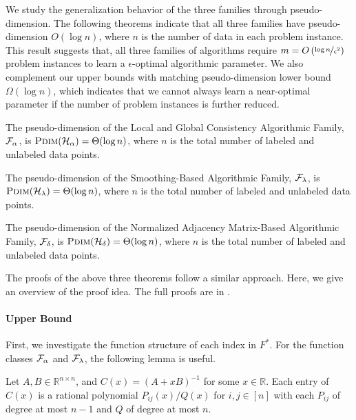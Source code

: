 We study the generalization behavior of the three families through pseudo-dimension. The following theorems indicate that all three families have pseudo-dimension $O(\log n)$, where $n$ is the number of data in each problem instance. This result suggests that, all three families of algorithms require $m = O\left(\nicefrac{\log n}{\epsilon^2}\right)$ problem instances to learn a $\epsilon$-optimal algorithmic parameter. We also complement our upper bounds with matching pseudo-dimension lower bound $\Omega(\log n)$, which indicates that we cannot always learn a near-optimal parameter if the number of problem instances is further reduced.

\begin{theorem} \label{thm:alpha upper bound}
    The pseudo-dimension of the Local and Global Consistency Algorithmic Family, $\mathcal{F}_\alpha$, is $\textsc{Pdim}(\mathcal{H}_\alpha) = \Theta(\log n)$, where $n$ is the total number of labeled and unlabeled data points.
\end{theorem}

\begin{theorem}\label{thm:lambda upper bound}
    The pseudo-dimension of the Smoothing-Based Algorithmic Family, $\mathcal{F}_\lambda$, is $\textsc{Pdim}(\mathcal{H}_\lambda) = \Theta(\log n)$, where $n$ is the total number of labeled and unlabeled data points.
\end{theorem}

\begin{theorem}\label{thm:delta upper bound}
    The pseudo-dimension of the Normalized Adjacency Matrix-Based Algorithmic Family, $\mathcal{F}_\delta$, is $\textsc{Pdim}(\mathcal{H}_\delta) = \Theta(\log n)$, where $n$ is the total number of labeled and unlabeled data points.
\end{theorem}

\noindent The proofs of the above three theorems follow a similar approach. Here, we give an overview of the proof idea. The full proofs are in .

\paragraph{Upper Bound}
First, we investigate the function structure of each index in $F^*$.
For the function classes $\mathcal{F}_\alpha$ and $\mathcal{F}_\lambda$, the following lemma is useful.
\begin{lemma}\label{lem:degree of determinant}
     Let $A, B \in \mathbb{R}^{n \times n}$, and $C(x) = (A + xB)^{-1}$ for some $x \in \mathbb{R}$. Each entry of $C(x)$ is a rational polynomial $P_{ij}(x)/Q(x)$ for $i, j \in [n]$ with each $P_{ij}$ of degree at most $n-1$ and $Q$ of degree at most $n$.
\end{lemma}

